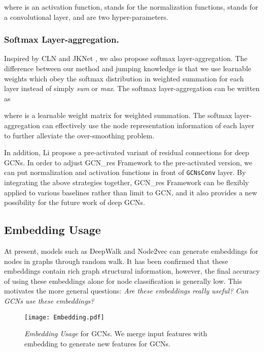 \documentclass[runningheads]{llncs}
\begin{document}
where  is an activation function,  stands for the normalization functions,  stands for a convolutional layer,  and  are two hyper-parameters.

\subsubsection{Softmax Layer-aggregation.} Inspired by CLN \cite{pham2017column} and JKNet \cite{xu2018representation}, we also propose softmax layer-aggregation. The difference between our method and jumping knowledge is that we use learnable weights which obey the softmax distribution in weighted summation for each layer instead of simply \textsl{sum} or \textsl{max}. The softmax layer-aggregation can be written as 





where  is a learnable weight matrix for weighted summation. The softmax layer-aggregation can effectively use the node representation
information of each layer to further alleviate the over-smoothing
problem.



In addition, Li  \cite{li2020deepergcn} propose a pre-activated variant of residual connections for deep GCNs. In order to adjust GCN\_res Framework to the pre-activated version, we can put normalization and activation functions in front of \texttt{GCNsConv} layer. By integrating the above strategies together, GCN\_res Framework can be flexibly applied to
various baselines rather than limit to GCN, and it also provides a new possibility for the
future work of deep GCNs.


\subsection{Embedding Usage}




At present, models such as DeepWalk \cite{perozzi2014deepwalk} and Node2vec \cite{grover2016node2vec} can generate embeddings
for nodes in graphs through random walk. It has been confirmed that these embeddings contain rich graph structural information, however, the final accuracy of using these embeddings alone for node classification is generally low. This motivates the more general questions: \textsl{Are these embeddings really useful? Can GCNs use these embeddings?}

\begin{figure}[htbp]
    \centering
    \texttt{[image: Embedding.pdf]}
    \caption{\textsl{Embedding Usage} for GCNs. We merge input features with embedding to generate new features for GCNs.}
    \label{fig:Embedding}
\end{figure}
\end{document}
